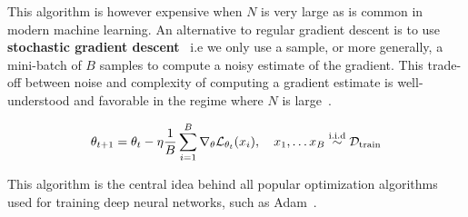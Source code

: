 This algorithm is however expensive when $N$ is very large as is common in modern machine learning. An alternative to regular gradient descent is to use \textbf{stochastic gradient descent}~\citep{robbins1951stochastic}  i.e we only use a sample, or more generally, a mini-batch of $B$ samples to compute a noisy estimate of the gradient. This trade-off between noise and complexity of computing a gradient estimate is well-understood and favorable in the regime where $N$ is large~\citep{tradeoffs2007bottou}.

\begin{equation}
\label{eq:stochastic_gradient_descent}
    \theta_{t+1} = \theta_t - \eta \frac{1}{B} \sum_{i=1}^B \nabla_\theta {\mathcal{L}}_{\theta_t}(x_i), \quad x_1, \dots x_B \stackrel{\footnotesize{\text{i.i.d}}}{\sim} {\mathcal{D}}_\text{train}
\end{equation}

This algorithm is the central idea behind all popular optimization algorithms used for training deep neural networks, such as Adam~\citep{kingma2014adam}.
